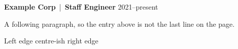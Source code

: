 \documentclass{article}
\begin{document}
\textbf{Example Corp} \,|\, \textbf{Staff Engineer} \hfill 2021--present

A following paragraph, so the entry above is not the last line on the page.

Left edge \hfill centre-ish \hfill right edge
\end{document}
